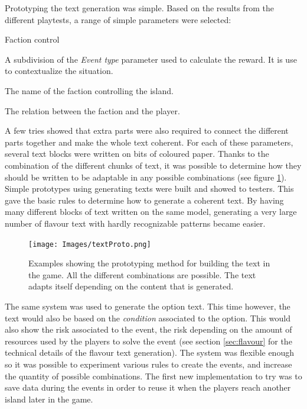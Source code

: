 Prototyping the text generation was simple. Based on the results from the different playtests, a range of simple parameters were selected:
\begin{labeling}{Faction control}
\item [\textbf{Location Type}] A subdivision of the \textit{Event type} parameter used to calculate the reward. It is use to contextualize the situation.
\item [\textbf{Faction control}] The name of the faction controlling the island.
\item [\textbf{Allegiance}] The relation between the faction and the player.
\end{labeling}

A few tries showed that extra parts were also required to connect the different parts together and make the whole text coherent. For each of these parameters, several text blocks were written on bits of coloured paper. Thanks to the combination of the different chunks of text, it was possible to determine how they should be written to be adaptable in any possible combinations (see figure \ref{fig:textproto}). Simple prototypes using generating texts were built and showed to testers. This gave the basic rules to determine how to generate a coherent text. By having many different blocks of text written on the same model, generating a very large number of flavour text with hardly recognizable patterns became easier. 
\begin{figure}[h]
    \centering
    \texttt{[image: Images/textProto.png]}
    \caption{Examples showing the prototyping method for building the text in the game. All the different combinations are possible. The text adapts itself depending on the content that is generated.}
    \label{fig:textproto}
\end{figure}

The same system was used to generate the option text. This time however, the text would also be based on the \textit{condition} associated to the option. This would also show the risk associated to the event, the risk depending on the amount of resources used by the players to solve the event (see section \ref{sec:flavour} for the technical details of the flavour text generation). The system was flexible enough so it was possible to experiment various rules to create the events, and increase the quantity of possible combinations. The first new implementation to try was to save data during the events in order to reuse it when the players reach another island later in the game.

